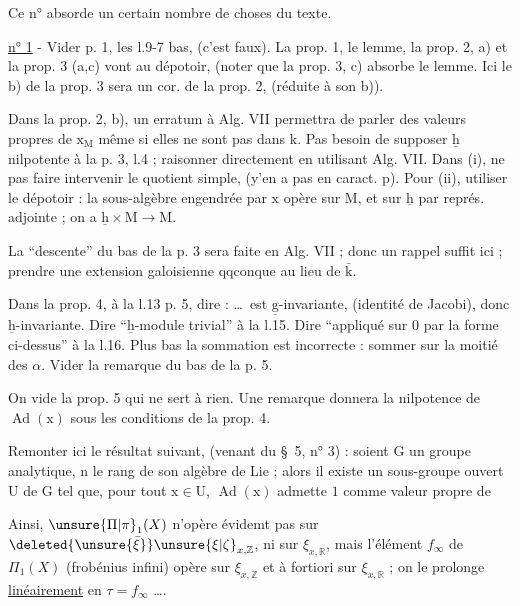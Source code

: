 Ce n° absorde un certain nombre de choses du texte.

\uline{n° 1} - Vider p. 1, les l.9-7 bas, (c'est faux). La prop. 1, le lemme, la prop. 2, a) et la prop. 3 (a,c) vont au dépotoir, (noter que la prop. 3, c) absorbe le lemme. Ici le b) de la prop. 3 sera un cor. de la prop. 2, (réduite à son b)).

Dans la prop. 2, b), un erratum à Alg. VII permettra de parler des valeurs propres de $\mathrm{x}_{\mathrm M}$ même si elles ne sont pas dans $\mathrm{k}$. Pas besoin de supposer $\underline{\mathrm h}$ nilpotente à la p. 3, l.4 ; raisonner directement en utilisant Alg. VII. Dans (i), ne pas faire intervenir le quotient simple, (y'en a pas en caract. $\mathrm{p}$). Pour (ii), utiliser le dépotoir : la sous-algèbre engendrée par $\mathrm{x}$ opère sur $\mathrm{M}$, et sur $\underline{\mathrm h}$ par représ. adjointe ; on a $\underline{\mathrm h}\times\mathrm{M}\longrightarrow\mathrm{M}$.

La ``descente'' du bas de la p. 3 sera faite en Alg. VII ; donc un rappel suffit ici ; prendre une extension galoisienne qqconque au lieu de $\bar{\mathrm{k}}$.

Dans la prop. 4, à la l.13 p. 5, dire : \ldots\ est $\underline{\mathrm{g}}$-invariante, (identité de Jacobi), donc $\underline{\mathrm{h}}$-invariante. Dire ``$\underline{\mathrm{h}}$-module trivial'' à la l.15. Dire ``appliqué sur $0$ par la forme ci-dessus'' à la l.16. Plus bas la sommation est incorrecte : sommer sur la moitié des $\alpha$. Vider la remarque du bas de la p. 5.

On vide la prop. 5 qui ne sert à rien. Une remarque donnera la nilpotence de $\operatorname{Ad}(\mathrm{x})$ sous les conditions de la prop. 4.

Remonter ici le résultat suivant, (venant du \S\ 5, n° 3) : soient $\mathrm{G}$ un groupe analytique, $\mathrm{n}$ le rang de son algèbre de Lie ; alors il existe un sous-groupe ouvert $\mathrm{U}$ de $\mathrm{G}$ tel que, pour tout $\mathrm{x}\in\mathrm{U}$, $\operatorname{Ad}(\mathrm{x})$ admette $1$ comme valeur propre de

Ainsi, $\unsure{\Pi|\pi}_1(X)$ n’opère évidemt pas sur $\deleted{\unsure{\bar{\xi}}}\unsure{\xi|\zeta}_{x,\mathbb{Z}}$, ni  sur $\xi_{x,\mathbb{R}}$, mais l’élément $f_\infty$ de $\Pi_1(X)$ (frobénius infini) opère sur $\xi_{x,\mathbb{Z}}$ et à fortiori sur $\xi_{x,\mathbb{R}}$ ; on le prolonge \uline{linéairement} en $\tau=f_\infty$ \ldots.

